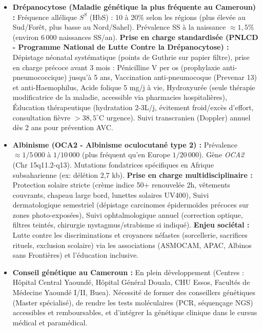 \documentclass[11pt]{article}
\begin{document}
\begin{savaistu}
\begin{itemize}
    \item \textbf{Drépanocytose (Maladie génétique la plus fréquente au Cameroun) :} Fréquence allélique $S^S$ (HbS) : 10 à 20\% selon les régions (plus élevée au Sud/Forêt, plus basse au Nord/Sahel). Prévalence SS à la naissance $\approx 1,5\%$ (environ 6\,000 naissances SS/an). \textbf{Prise en charge standardisée (PNLCD - Programme National de Lutte Contre la Drépanocytose) :} Dépistage néonatal systématique (points de Guthrie sur papier filtre), prise en charge précoce avant 3 mois : Pénicilline V per os (prophylaxie anti-pneumococcique) jusqu'à 5 ans, Vaccination anti-pneumocoque (Prevenar 13) et anti-Haemophilus, Acide folique 5 mg/j à vie, Hydroxyurée (seule thérapie modificatrice de la maladie, accessible via pharmacies hospitalières), Éducation thérapeutique (hydratation 2-3L/j, évitement froid/excès d'effort, consultation fièvre $>38,5^\circ$C urgence). Suivi transcranien (Doppler) annuel dès 2 ans pour prévention AVC.
    \item \textbf{Albinisme (OCA2 - Albinisme oculocutané type 2) :} Prévalence $\approx 1/5\,000$ à $1/10\,000$ (plus fréquent qu'en Europe $1/20\,000$). Gène \emph{OCA2} (Chr 15q11.2-q13). Mutations fondatrices spécifiques en Afrique subsaharienne (ex: délétion 2,7 kb). \textbf{Prise en charge multidisciplinaire :} Protection solaire stricte (crème indice 50+ renouvelée 2h, vêtements couvrants, chapeau large bord, lunettes solaires UV400), Suivi dermatologique semestriel (dépistage carcinomes épidermoïdes précoces sur zones photo-exposées), Suivi ophtalmologique annuel (correction optique, filtres teintés, chirurgie nystagmus/strabisme si indiqué). \textbf{Enjeu sociétal :} Lutte contre les discriminations et croyances néfastes (sorcellerie, sacrifices rituels, exclusion scolaire) via les associations (ASMOCAM, APAC, Albinos sans Frontières) et l'éducation inclusive.
    \item \textbf{Conseil génétique au Cameroun :} En plein développement (Centres : Hôpital Central Yaoundé, Hôpital Général Douala, CHU Essos, Facultés de Médecine Yaoundé I/II, Buea). Nécessité de former des conseillers génétiques (Master spécialisé), de rendre les tests moléculaires (PCR, séquençage NGS) accessibles et remboursables, et d'intégrer la génétique clinique dans le cursus médical et paramédical.
\end{itemize}
\end{savaistu}
\end{document}
